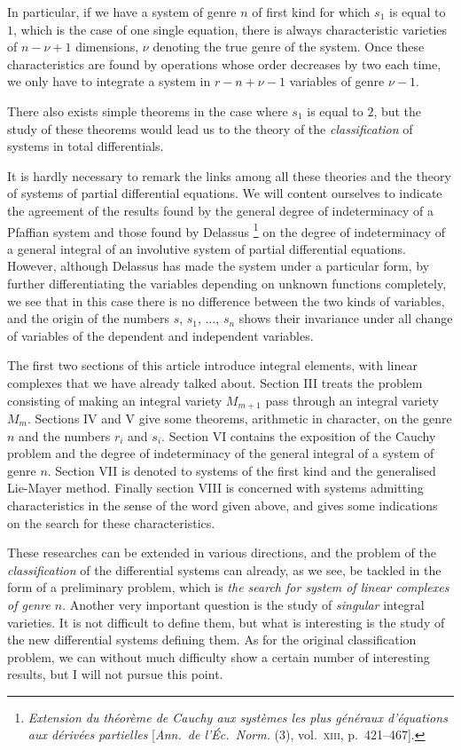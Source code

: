 \documentclass[leqno,11pt]{book}
\theoremstyle{shape1}
\theoremstyle{shapesmall}
\begin{document}
In particular, if we have a system of genre $n$ of first kind for which $s_{1}$ is equal to $1$, which is the case of one single equation, there is always characteristic varieties of $n-\nu+1$ dimensions, $\nu$ denoting the true genre of the system. Once these characteristics are found by operations whose order decreases by two each time, we only have to integrate a system in $r-n+\nu-1$ variables of genre $\nu-1$.

There also exists simple theorems in the case where $s_{1}$ is equal to $2$, but the study of these theorems would lead us to the theory of the \emph{classification} of systems in total differentials.

It is hardly necessary to remark the links among all these theories and the theory of systems of partial differential equations. We will content ourselves to indicate the agreement of the results found by the general degree of indeterminacy of a Pfaffian system and those found by Delassus \footnote{\emph{Extension du théorème de Cauchy aux systèmes les plus généraux d'équations aux dérivées partielles} [\emph{Ann.~de l'Éc.~Norm.} (3), vol.~\textsc{xiii}, p.~421--467].} on the degree of indeterminacy of a general integral of an involutive system of partial differential equations. However, although Delassus has made the system under a particular form, by further differentiating the variables depending on unknown functions completely, we see that in this case there is no difference between the two kinds of variables, and the origin of the numbers $s$, $s_{1}$, $\dots$, $s_{n}$ shows their invariance under all change of variables of the dependent and independent variables.

The first two sections of this article introduce integral elements, with linear complexes that we have already talked about. Section III treats the problem consisting of making an integral variety $M_{m+1}$ pass through an integral variety $M_{m}$. Sections IV and V give some theorems, arithmetic in character, on the genre $n$ and the numbers $r_{i}$ and $s_{i}$. Section VI contains the exposition of the Cauchy problem and the degree of indeterminacy of the general integral of a system of genre $n$. Section VII is denoted to systems of the first kind and the generalised Lie-Mayer method. Finally section VIII is concerned with systems admitting characteristics in the sense of the word given above, and gives some indications on the search for these characteristics.

These researches can be extended in various directions, and the problem of the \emph{classification} of the differential systems can already, as we see, be tackled in the form of a preliminary problem, which is \emph{the search for system of linear complexes of genre $n$}. Another very important question is the study of \emph{singular} integral varieties. It is not difficult to define them, but what is interesting is the study of the new differential systems defining them. As for the original classification problem, we can without much difficulty show a certain number of interesting results, but I will not pursue this point.
\end{document}
